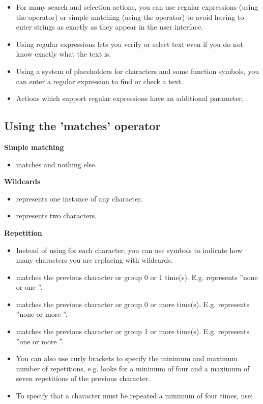  \begin{itemize}
\item For many search and selection actions, you can use regular expressions (using the  operator) or simple matching (using the  operator) to avoid having to enter strings as exactly as they appear in the user interface. 
\item Using regular expressions lets you verify or select text even if you do not know exactly what the text is.
\item Using a system of placeholders for characters and some function symbols, you can enter a regular expression to find or check a text.
\item Actions which support regular expressions have an additional parameter, . 
\end{itemize}

\subsection{Using the 'matches' operator}
\label{regex}

\textbf{Simple matching}
\begin{itemize}
\item {} matches  and nothing else.
\end{itemize}

\textbf{Wildcards}
\begin{itemize}
\item {} represents one instance of any character.
\item {} represents two characters.  
\end{itemize}

\textbf{Repetition}
\begin{itemize}
\item Instead of using  for each character, you can use symbols to indicate how many characters you are replacing with wildcards.
\item {} matches the previous character or group 0 or 1 time(s). E.g.  represents ''none or one ''.
\item \bxshell{*} matches the previous character or group 0 or more time(s). E.g.  represents ''none or more ''.
\item \bxshell{+} matches the previous character or group 1 or more time(s). E.g.  represents ''one or more ''.
\item You can also use curly brackets \bxshell{\{\}}  to specify the minimum and maximum number of repetitions, e.g.  looks for a minimum of four and a maximum of seven repetitions of the previous character.
\item To specify that a character must be repeated a minimum of four times, use: 
\end{itemize}

